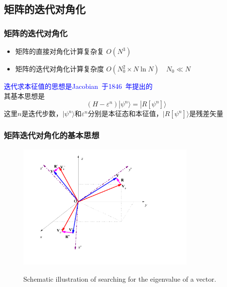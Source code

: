 \subsection{矩阵的迭代对角化}
\frame
{
	\frametitle{矩阵的迭代对角化}
	\begin{itemize}
		\item 矩阵的直接对角化计算复杂复 $O(N^3)$
		\item 矩阵的迭代对角化计算复杂度 $O(N_0^2\times N\ln N)\quad N_0\ll N$
	\end{itemize}
	\textcolor{blue}{迭代求本征值的思想是\textrm{Jacobian~}于\textrm{1846~}年提出的}\\
	其基本思想是
	\begin{displaymath}
		(H-\varepsilon^n)|\psi^n\rangle=|R[\psi^n]\rangle
	\end{displaymath}
	这里$n$是迭代步数，$|\psi^n\rangle$和$\varepsilon^n$分别是本征态和本征值，$|R[\psi^n]\rangle$是残差矢量
	\vskip 10pt
	{\fontsize{7.2pt}{1.2pt}}
}

\frame
{
	\frametitle{矩阵迭代对角化的基本思想}
\begin{figure}[h!]
\centering
\includegraphics[height=2.5in,width=3.5in,viewport=0 0 850 590,clip]{Figures/Coordinate_transformation.png}
\label{Coordinate_transformation}
\caption{\tiny \textrm{Schematic illustration of searching for the eigenvalue of a vector.}}%
\end{figure}
}

